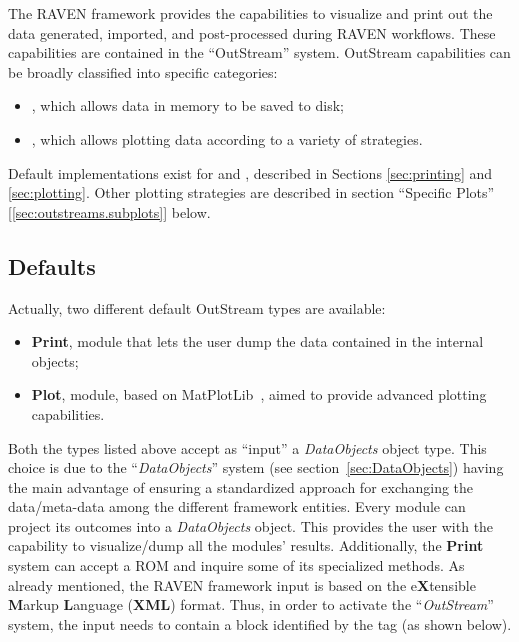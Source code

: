The RAVEN framework provides the capabilities to visualize and print out the
data generated, imported, and post-processed during RAVEN workflows.
%
These capabilities are contained in the ``OutStream'' system.
%
OutStream capabilities can be broadly classified into specific categories:
\vspace{-5mm}
\begin{itemize}
  \itemsep0em
  \item {}, which allows data in memory to be saved to disk;
  \item {}, which allows plotting data according to a variety of strategies.
\end{itemize}
\vspace{-5mm}
Default implementations exist for  and , described in
Sections \ref{sec:printing} and \ref{sec:plotting}. Other plotting strategies are described in section
``Specific Plots'' [\ref{sec:outstreams.subplots}] below.

\subsection{Defaults}
Actually, two different default OutStream types are available:
\vspace{-5mm}
\begin{itemize}
  \itemsep0em
  \item \textbf{Print}, module that lets the user dump the data contained in the
  internal objects;
  \item \textbf{Plot}, module, based on MatPlotLib~\cite{MatPlotLib}, aimed to
  provide advanced plotting capabilities.
\end{itemize}
\vspace{-5mm}
Both the types listed above accept as ``input'' a \textit{DataObjects} object
type.
%
This choice is due to the ``\textit{DataObjects}'' system (see
section~\ref{sec:DataObjects}) having the main advantage of ensuring a standardized
approach for exchanging the data/meta-data among the different framework
entities.
%
Every module can project its outcomes into a \textit{DataObjects} object.
%
This provides the user with the capability to visualize/dump all the modules'
results.
%
Additionally, the \textbf{Print} system can accept a ROM and inquire some of its
specialized methods.
%
As already mentioned, the RAVEN
framework input is based on the e\textbf{X}tensible \textbf{M}arkup
\textbf{L}anguage (\textbf{XML}) format.
%
Thus, in order to activate the ``\textit{OutStream}'' system, the input needs to
contain a block identified by the  tag (as shown
below).

